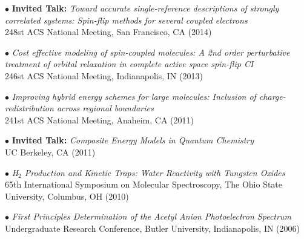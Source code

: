 \documentclass[10pt]{article}
\newenvironment{lonelist}[1][\enskip\textbullet]%
        {\vspace{-\baselineskip}\begin{list}{#1}{%
        \setlength{\partopsep}{0pt}%
        \setlength{\topsep}{0pt}}}
        {\end{list}\vspace{-.6\baselineskip}}
\begin{document}
\begin{lonelist}
\item[$\bullet$] \textbf{Invited Talk:} \textit{Toward accurate single-reference descriptions of strongly correlated systems: Spin-flip methods for several coupled electrons}\\
248st ACS National Meeting, San Francisco, CA (2014) 

\item[$\bullet$] \textit{Cost effective modeling of spin-coupled molecules: A 2nd order perturbative treatment of orbital relaxation in complete active space spin-flip CI}\\
246st ACS National Meeting, Indianapolis, IN (2013) 

\item[$\bullet$] \textit{Improving hybrid energy schemes for large molecules: Inclusion of charge-redistribution across regional boundaries}\\ 
241st ACS National Meeting, Anaheim, CA (2011) 

\item[$\bullet$] \textbf{Invited Talk:} \textit{Composite Energy Models in Quantum Chemistry} \\
UC Berkeley, CA (2011)

\item[$\bullet$] \textit{H$_2$ Production and Kinetic Traps: Water Reactivity with Tungsten Oxides}\\ 
65th International Symposium on Molecular Spectroscopy, The Ohio State University, Columbus, OH (2010) 

\item[$\bullet$] \textit{First Principles Determination of the Acetyl Anion Photoelectron Spectrum}\\
Undergraduate Research Conference, Butler University, Indianapolis, IN (2006)\\\\
\end{lonelist}
\end{document}
